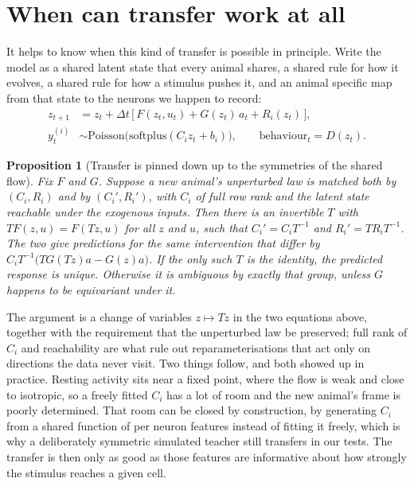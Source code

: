\documentclass[11pt,letterpaper]{article}
\newtheorem{proposition}{Proposition}
\begin{document}
\section{When can transfer work at all}

It helps to know when this kind of transfer is possible in principle. Write the model
as a shared latent state that every animal shares, a shared rule for how it evolves,
a shared rule for how a stimulus pushes it, and an animal specific map from that state
to the neurons we happen to record:
\begin{align}
z_{t+1} &= z_t + \Delta t\,\big[\,F(z_t, u_t) + G(z_t)\,a_t + R_i(z_t)\,\big],\\
y^{(i)}_t &\sim \mathrm{Poisson}\big(\mathrm{softplus}(C_i z_t + b_i)\big),
\qquad \text{behaviour}_t = D(z_t).
\end{align}

\begin{proposition}[Transfer is pinned down up to the symmetries of the shared flow]
\label{prop:ident}
Fix $F$ and $G$. Suppose a new animal's unperturbed law is matched both by
$(C_i, R_i)$ and by $(C_i', R_i')$, with $C_i$ of full row rank and the latent state
reachable under the exogenous inputs. Then there is an invertible $T$ with
$T F(z,u) = F(Tz,u)$ for all $z$ and $u$, such that $C_i' = C_i T^{-1}$ and
$R_i' = T R_i T^{-1}$. The two give predictions for the same intervention that differ
by $C_i T^{-1}\big(T G(Tz)a - G(z)a\big)$. If the only such $T$ is the identity, the
predicted response is unique. Otherwise it is ambiguous by exactly that group, unless
$G$ happens to be equivariant under it.
\end{proposition}

The argument is a change of variables $z \mapsto Tz$ in the two equations above,
together with the requirement that the unperturbed law be preserved; full rank of
$C_i$ and reachability are what rule out reparameterisations that act only on
directions the data never visit. Two things follow, and both showed up in practice.
Resting activity sits near a fixed point, where the flow is weak and close to
isotropic, so a freely fitted $C_i$ has a lot of room and the new animal's frame is
poorly determined. That room can be closed by construction, by generating $C_i$ from a
shared function of per neuron features instead of fitting it freely, which is why a
deliberately symmetric simulated teacher still transfers in our tests. The transfer is
then only as good as those features are informative about how strongly the stimulus
reaches a given cell.
\end{document}
